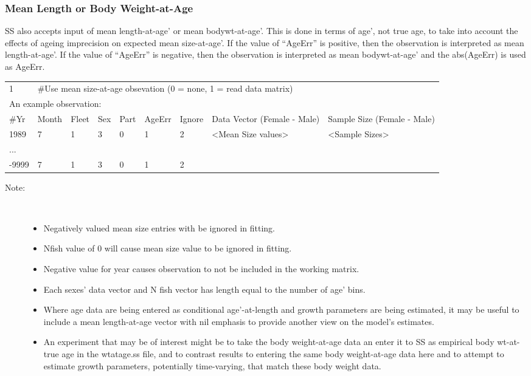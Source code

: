 \subsubsection{Mean Length or Body Weight-at-Age}
SS also accepts input of mean length-at-age’ or mean bodywt-at-age’.  This is done in terms of age’, not true age, to take into account the effects of ageing imprecision on expected mean size-at-age’.  If the value of “AgeErr” is positive, then the observation is interpreted as mean length-at-age’.  If the value of “AgeErr” is negative, then the observation is interpreted as mean bodywt-at-age’ and the abs(AgeErr) is used as AgeErr.

\begin{center}
	\begin{tabular}{p{0.75cm} p{1cm} p{0.75cm} p{1cm} p{0.75cm} p{1cm} p{1cm} p{3.2cm} p{3.2cm} }
		\hline
		1 & \multicolumn{8}{l}{\#Use mean size-at-age obsevation (0 = none, 1 = read data matrix)} \\
		\multicolumn{9}{l}{An example observation:}\\
		\hline
		\#Yr & Month & Fleet & Sex & Part & AgeErr & Ignore & Data Vector (Female - Male) & Sample Size (Female - Male) \\
		\hline
		1989  & 7 & 1 & 3 & 0 & 1 & 2 & <Mean Size values> & <Sample Sizes> \\
		...   &   &   &   &   &   &   &  & \\
		-9999 & 7 & 1 & 3 & 0 & 1 & 2 &  & \\
		\hline
	\end{tabular}
\end{center}

\begin{description}
	\item[Note:]\
	\begin{itemize}
		\item Negatively valued mean size entries with be ignored in fitting.
		\item Nfish value of 0 will cause mean size value to be ignored in fitting.
		\item Negative value for year causes observation to not be included in the working matrix.
		\item Each sexes' data vector and N fish vector has length equal to the number of age' bins.
		\item Where age data are being entered as conditional age’-at-length and growth parameters are being estimated, it may be useful to include a mean length-at-age vector with nil emphasis to provide another view on the model’s estimates.
		\item An experiment that may be of interest might be to take the body weight-at-age data an enter it to SS as empirical body wt-at-true age in the wtatage.ss file, and to contrast results to entering the same body weight-at-age data here and to attempt to estimate growth parameters, potentially time-varying, that match these body weight data.		
	\end{itemize}
\end{description}

